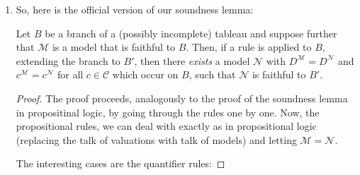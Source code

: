 \begin{enumerate}[{\thesection}.1]
                  \item So, here is the official version of our
                    soundness lemma:

                    \begin{lemma}
                      Let $B$ be a branch of a (possibly incomplete)
                      tableau and suppose further that $\mathcal{M}$
                      is a model that is faithful to $B$. Then, if a
                      rule is applied to $B$, extending the branch to
                      $B'$, then there \emph{exists} a model
                      $\mathcal{N}$ with
                      $D^\mathcal{M}=D^\mathcal{N}$ and
                      $c^\mathcal{M}=c^\mathcal{N}$ for all
                      $c\in\mathcal{C}$ which occur on $B$, such that
                      $\mathcal{N}$ is faithful to $B'$. 
                     
                    \end{lemma}

                    \begin{proof}
                      The proof proceeds, analogously to the proof of the
                      soundness lemma in propositinal logic, by going
                      through the rules one by one. Now, the
                      propositional rules, we can deal with exactly as
                      in propositional logic (replacing the talk of
                      valuations with talk of models) and letting
                      $\mathcal{M}=\mathcal{N}$.

                      The interesting cases are the quantifier rules:


\end{proof}
\end{enumerate}
